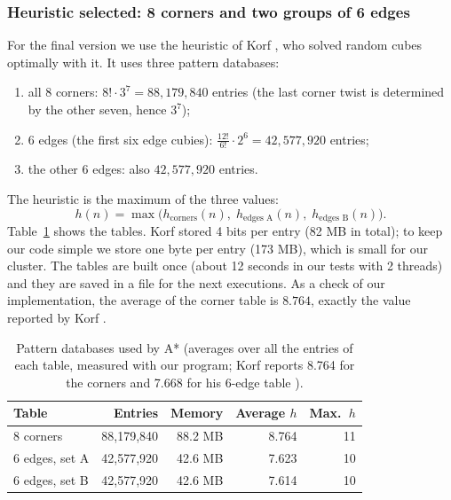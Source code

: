 \subsubsection{Heuristic selected: 8 corners and two groups of 6 edges}
For the final version we use the heuristic of Korf \cite{korf1997}, who solved random cubes optimally with it. It uses three pattern databases:
\begin{enumerate}
    \item all 8 corners: $8! \cdot 3^7 = 88{,}179{,}840$ entries (the last corner twist is determined by the other seven, hence $3^7$);
    \item 6 edges (the first six edge cubies): $\frac{12!}{6!} \cdot 2^6 = 42{,}577{,}920$ entries;
    \item the other 6 edges: also $42{,}577{,}920$ entries.
\end{enumerate}
The heuristic is the maximum of the three values:
\begin{equation}
    h(n) = \max\bigl(h_{\text{corners}}(n),\; h_{\text{edges A}}(n),\; h_{\text{edges B}}(n)\bigr).
\end{equation}
Table~\ref{tab:pdb} shows the tables. Korf stored 4 bits per entry (82 MB in total); to keep our code simple we store one byte per entry (173 MB), which is small for our cluster. The tables are built once (about 12 seconds in our tests with 2 threads) and they are saved in a file for the next executions. As a check of our implementation, the average of the corner table is $8.764$, exactly the value reported by Korf \cite{korf1997}.

\begin{table}[H]
    \centering
    \renewcommand{\arraystretch}{1.3}
    \begin{tabular}{lrrrr}
        \toprule
        \textbf{Table} & \textbf{Entries} & \textbf{Memory} & \textbf{Average $h$} & \textbf{Max.\ $h$} \\
        \midrule
        8 corners          & 88,179,840 & 88.2 MB & 8.764 & 11 \\
        6 edges, set A     & 42,577,920 & 42.6 MB & 7.623 & 10 \\
        6 edges, set B     & 42,577,920 & 42.6 MB & 7.614 & 10 \\
        \bottomrule
    \end{tabular}
    \caption{Pattern databases used by A* (averages over all the entries of each table, measured with our program; Korf reports 8.764 for the corners and 7.668 for his 6-edge table \cite{korf1997}).}
    \label{tab:pdb}
\end{table}


